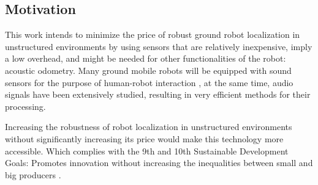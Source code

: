 \subsection{Motivation} \label{subsec:motivation}

This work intends to minimize the price of robust ground robot localization in
unstructured environments by using sensors that are relatively inexpensive,
imply a low overhead, and might be needed for other functionalities of the
robot: acoustic odometry. Many ground mobile robots will be equipped with sound
sensors for the purpose of human-robot interaction \cite{VoiceForklift}, at the
same time, audio signals have been extensively studied, resulting in very
efficient methods for their processing.

Increasing the robustness of robot localization in unstructured environments
without significantly increasing its price would make this technology more
accessible. Which complies with the 9th and 10th Sustainable Development Goals:
Promotes innovation without increasing the inequalities between small and big
producers \cite{SDG}.